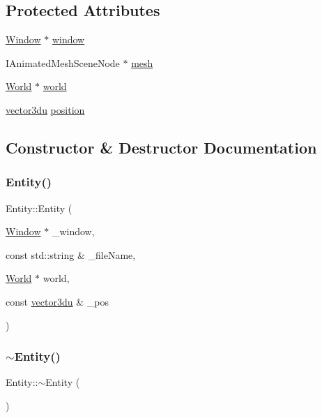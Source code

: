 \subsection*{Protected Attributes}
\begin{DoxyCompactItemize}
\item 
\mbox{\hyperlink{class_window}{Window}} $\ast$ \mbox{\hyperlink{class_entity_a1f2791b6a53a16e200a687f843cee7fb}{window}}
\item 
I\+Animated\+Mesh\+Scene\+Node $\ast$ \mbox{\hyperlink{class_entity_adb691a1a6673fe33622280d1b51dfd2f}{mesh}}
\item 
\mbox{\hyperlink{class_world}{World}} $\ast$ \mbox{\hyperlink{class_entity_a038b06c38fe6bb385f37c05a5647c0dc}{world}}
\item 
\mbox{\hyperlink{_utility_8hpp_ac675fa2b6c79d0be47ae76e5d0ce38a8}{vector3du}} \mbox{\hyperlink{class_entity_a17bbbb9c9f1a69803172f6ca830cf2f2}{position}}
\end{DoxyCompactItemize}


\subsection{Constructor \& Destructor Documentation}
\mbox{\label{class_entity_a3aa7f1038f236833533a55440eb35a49}} 
\subsubsection{\texorpdfstring{Entity()}{Entity()}}
{\footnotesize\ttfamily Entity\+::\+Entity (\begin{DoxyParamCaption}\item[{\mbox{\hyperlink{class_window}{Window}} $\ast$}]{\+\_\+window,  }\item[{const std\+::string \&}]{\+\_\+file\+Name,  }\item[{\mbox{\hyperlink{class_world}{World}} $\ast$}]{world,  }\item[{const \mbox{\hyperlink{_utility_8hpp_ac675fa2b6c79d0be47ae76e5d0ce38a8}{vector3du}} \&}]{\+\_\+pos }\end{DoxyParamCaption})}

\mbox{\label{class_entity_adf6d3f7cb1b2ba029b6b048a395cc8ae}} 
\subsubsection{\texorpdfstring{$\sim$Entity()}{~Entity()}}
{\footnotesize\ttfamily Entity\+::$\sim$\+Entity (\begin{DoxyParamCaption}{ }\end{DoxyParamCaption})\hspace{0.3cm}{\ttfamily [virtual]}}



